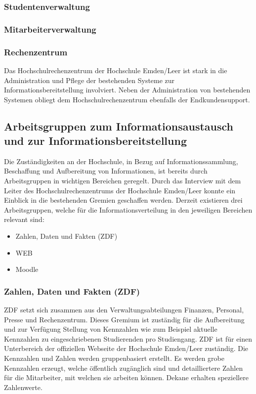 \subsubsection{Studentenverwaltung}
\subsubsection{Mitarbeiterverwaltung}
\subsubsection{Rechenzentrum}
Das Hochschulrechenzentrum der Hochschule Emden/Leer ist stark in die Administration und Pflege der bestehenden Systeme zur Informationsbereitstellung involviert. Neben der Administration von bestehenden Systemen obliegt dem Hochschulrechenzentrum ebenfalls der Endkundensupport.

\subsection{Arbeitsgruppen zum Informationsaustausch und zur Informationsbereitstellung}
Die Zuständigkeiten an der Hochschule, in Bezug auf Informationssammlung, Beschaffung und Aufbereitung von Informationen, ist bereits durch Arbeitsgruppen in wichtigen Bereichen geregelt. Durch das Interview mit dem Leiter des Hochschulrechenzentrums der Hochschule Emden/Leer konnte ein Einblick in die bestehenden Gremien geschaffen werden. Derzeit existieren drei Arbeitsgruppen, welche für die Informationsverteilung in den jeweiligen Bereichen relevant sind:

\begin{itemize}
	\item Zahlen, Daten und Fakten (ZDF)
	\item WEB
	\item Moodle
\end{itemize}

\subsubsection{Zahlen, Daten und Fakten (ZDF)}
ZDF setzt sich zusammen aus den Verwaltungsabteilungen Finanzen, Personal, Presse und Rechenzentrum. Dieses Gremium ist zuständig für die Aufbereitung und zur Verfügung Stellung von Kennzahlen wie zum Beispiel aktuelle Kennzahlen zu eingeschriebenen Studierenden pro Studiengang.  ZDF ist für einen Unterbereich der offiziellen Webseite der Hochschule Emden/Leer zuständig. Die Kennzahlen und Zahlen werden gruppenbasiert erstellt. Es werden grobe Kennzahlen erzeugt, welche öffentlich zugänglich sind und detailliertere Zahlen für die Mitarbeiter, mit welchen sie arbeiten können. Dekane erhalten speziellere Zahlenwerte.

